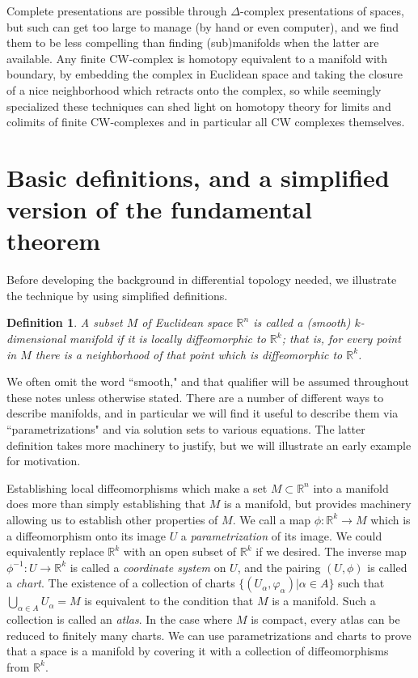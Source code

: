 \documentclass{amsart}          %
\newtheorem{definition}[theorem]{Definition}
\newcommand{\R}{\mathbb R}
\begin{document}
Complete presentations are possible through $\Delta$-complex
presentations of spaces, but such can get too large to manage (by hand or even computer), and we find them  to be less compelling
than finding (sub)manifolds when the latter are available.  
Any finite CW-complex is homotopy equivalent to a manifold with boundary, by  embedding the complex in Euclidean space
and taking the closure of a nice neighborhood which retracts onto the complex, so while seemingly specialized these techniques
can shed light on homotopy theory for limits and colimits of finite CW-complexes and in particular all CW complexes themselves.\newpage

\tableofcontents
\newpage

\section{Basic definitions, and a simplified version of the fundamental theorem}

Before developing the background in differential topology needed, we illustrate the technique by using simplified definitions.

\begin{definition}
	A subset $M$ of Euclidean space $\R^n$ is called a (smooth) $k$-dimensional manifold if it is locally diffeomorphic to $\R^k$; that is, for every point in $M$ there is a neighborhood of that point which is diffeomorphic to $\R^k$.  
\end{definition}

We often omit the word ``smooth," and that qualifier will be assumed throughout these notes unless otherwise stated. There are a number of different ways to describe manifolds, and in particular we will find it useful to describe them via ``parametrizations" and via solution sets to various equations. The latter definition takes more machinery to justify, but we will illustrate an early example for motivation.

Establishing local diffeomorphisms which make a set $M\subset \R^n$ into a manifold does more than simply establishing that $M$ is a manifold, but provides machinery allowing us to establish other properties of $M$. We call a map $\phi: \R^k \rightarrow M$ which is a diffeomorphism onto its image $U$ a \textit{parametrization} of its image. We could equivalently replace $\R^k$ with an open subset of $\R^k$ if we desired. The inverse map $\phi^{-1}:U\rightarrow \R^k$ is called a \textit{coordinate system} on $U$, and the pairing $(U, \phi)$ is called a \textit{chart}. The existence of a collection of charts $\{ (U_\alpha, \varphi_\alpha) | \alpha \in A\}$ such that $\bigcup_{\alpha\in A}U_\alpha = M$ is equivalent to the condition that $M$ is a manifold. Such a collection is called an \textit{atlas}. In the case where $M$ is compact, every atlas can be reduced to finitely many charts. We can use parametrizations and charts to prove that a space is a manifold by covering it with a collection of diffeomorphisms from $\R^k$.
\end{document}
